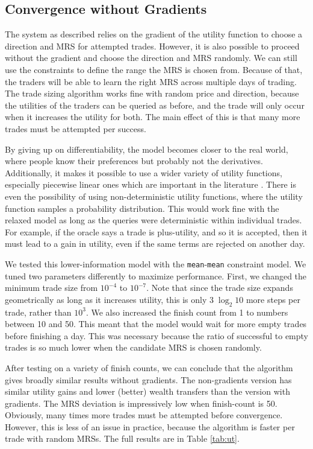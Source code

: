 \documentclass[12pt,a4paper,titlepage]{article}
\newcommand{\co}[1]{\texttt{#1}}
\begin{document}
\subsection{Convergence without Gradients}\label{nograd}
The system as described relies on the gradient of the utility function to choose a direction and MRS for attempted trades.
However, it is also possible to proceed without the gradient and choose the direction and MRS randomly.
We can still use the constraints to define the range the MRS is chosen from.
Because of that, the traders will be able to learn the right MRS across multiple days of trading.
The trade sizing algorithm works fine with random price and direction, because the utilities of the traders can be queried as before, and the trade will only occur when it increases the utility for both.
The main effect of this is that many more trades must be attempted per success.

By giving up on differentiability, the model becomes closer to the real world, where people know their preferences but probably not the derivatives.
Additionally, it makes it possible to use a wider variety of utility functions, especially piecewise linear ones which are important in the literature \cite{chen}.
There is even the possibility of using non-deterministic utility functions, where the utility function samples a probability distribution.
This would work fine with the relaxed model as long as the queries were deterministic within individual trades.
For example, if the oracle says a trade is plus-utility, and so it is accepted, then it must lead to a gain in utility, even if the same terms are rejected on another day.

We tested this lower-information model with the \co{mean}-\co{mean} constraint model.
We tuned two parameters differently to maximize performance. 
First, we changed the minimum trade size from $10^{-4}$ to $10^{-7}$.
Note that since the trade size expands geometrically as long as it increases utility, this is only $3 \; \log_2 10$ more steps per trade, rather than $10^3$.
We also increased the finish count from 1 to numbers between 10 and 50.
This meant that the model would wait for more empty trades before finishing a day.
This was necessary because the ratio of successful to empty trades is so much lower when the candidate MRS is chosen randomly.


After testing on a variety of finish counts, we can conclude that the algorithm gives broadly similar results without gradients. 
The non-gradients version has similar utility gains and lower (better) wealth transfers than the version with gradients.
The MRS deviation is impressively low when finish-count is 50.
Obviously, many times more trades must be attempted before convergence.
However, this is less of an issue in practice, because the algorithm is faster per trade with random MRSs.
The full results are in Table \ref{tab:ut}.
\end{document}
